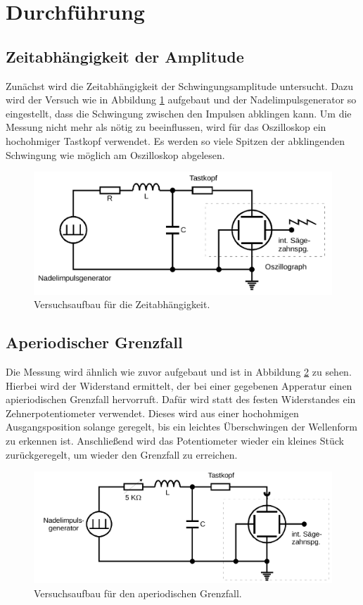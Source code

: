 \section{Durchführung}
\label{sec:Durchführung}
\subsection{Zeitabhängigkeit der Amplitude}
Zunächst wird die Zeitabhängigkeit der Schwingungsamplitude untersucht.
Dazu wird der Versuch wie in Abbildung \ref{fig:aufbau1} aufgebaut und der Nadelimpulsgenerator so eingestellt, 
dass die Schwingung zwischen den Impulsen abklingen kann.
Um die Messung nicht mehr als nötig zu beeinflussen, wird für das Oszilloskop ein hochohmiger Tastkopf verwendet.
Es werden so viele Spitzen der abklingenden Schwingung wie möglich am Oszilloskop abgelesen.
\begin{figure}[H]
    \centering
    \caption{Versuchsaufbau für die Zeitabhängigkeit.\cite{v354}}
    \label{fig:aufbau1}
    \includegraphics[width=\textwidth]{content/aufbau1.png}
\end{figure}
%
\subsection{Aperiodischer Grenzfall}
Die Messung wird ähnlich wie zuvor aufgebaut und ist in Abbildung \ref{fig:aufbau2} zu sehen.
Hierbei wird der Widerstand ermittelt, der bei einer gegebenen Apperatur einen apieriodischen Grenzfall hervorruft.
Dafür wird statt des festen Widerstandes ein Zehnerpotentiometer verwendet. 
Dieses wird aus einer hochohmigen Ausgangsposition solange geregelt, bis ein leichtes Überschwingen der Wellenform zu erkennen ist.
Anschließend wird das Potentiometer wieder ein kleines Stück zurückgeregelt, um wieder den Grenzfall zu erreichen.
\begin{figure}[H]
    \centering
    \caption{Versuchsaufbau für den aperiodischen Grenzfall.\cite{v354}}
    \label{fig:aufbau2}
    \includegraphics[width=\textwidth]{content/aufbau2.png}
\end{figure}
%
